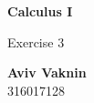 \documentclass[a4paper, 12pt]{article}
\begin{document}
    \begin{center}
        \vspace*{4.4cm}
            
        \Huge
        \textbf{Calculus I}
            
        \vspace{0.5cm}
        \LARGE
        Exercise 3

        \vfill
            
        \Large
        \textbf{Aviv Vaknin}\\316017128
                    
    \end{center}
\end{document}
